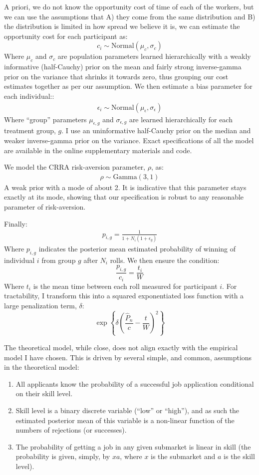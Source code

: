 \documentclass[a4paper,12pt]{article}
\begin{document}
A priori, we do not know the opportunity cost of time of each of the workers, but we can use the assumptions that A) they come from the same distribution and B) the distribution is limited in how spread we believe it is, we can estimate the opportunity cost for each participant as:
$$
c_i \sim \text{Normal}(\mu_c, \sigma_c)
$$
Where $\mu_c$ and $\sigma_c$ are population parameters learned hierarchically with a weakly informative (half-Cauchy) prior on the mean and fairly strong inverse-gamma prior on the variance that shrinks it towards zero, thus grouping our cost estimates together as per our assumption. We then estimate a bias parameter for each individual::
\begin{align*}
  \epsilon_i \sim \text{Normal}(\mu_{\epsilon}, \sigma_{\epsilon})
\end{align*}
Where ``group'' parameters $\mu_{\epsilon, g}$ and $\sigma_{\epsilon, g}$ are learned hierarchically for each treatment group, $g$. I use an uninformative half-Cauchy prior on the median and weaker inverse-gamma prior on the variance. Exact specifications of all the model are available in the online supplementary materials and code.

We model the CRRA risk-aversion parameter, $\rho$, as:
\begin{align*}
  \rho \sim \text{Gamma}(3, 1)
\end{align*}
A weak prior with a mode of about 2. It is indicative that this parameter stays exactly at its mode, showing that our specification is robust to any reasonable parameter of risk-aversion.

Finally:
\begin{align*}
  p_{i,g} = \frac{1}{1 + N_i(1 + \epsilon_g)}
\end{align*}
Where $p_{i,g}$ indicates the posterior mean estimated probability of winning of individual $i$ from group $g$ after $N_i$ rolls. We then ensure the condition:
$$
\frac{p_{i,g}}{c_i} = \frac{t_i}{W}
$$
Where $t_i$ is the mean time between each roll measured for participant $i$. For tractability, I transform this into a squared exponentiated loss function with a large penalization term, $\delta$:
$$
\exp \left\{ \delta \left(\frac{\hat{P}_n}{c} - \frac{t}{W} \right)^2 \right\}
$$

The theoretical model, while close, does not align exactly with the empirical model I have chosen. This is driven by several simple, and common, assumptions in the theoretical model:
%
\begin{enumerate}
\item All applicants know the probability of a successful job application conditional on their skill level.
\item Skill level is a binary discrete variable (``low'' or ``high''), and as such the estimated posterior mean of this variable is a non-linear function of the numbers of rejections (or successes).
\item The probability of getting a job in any given submarket is linear in skill (the probability is given, simply, by $xa$, where $x$ is the submarket and $a$ is the skill level).
\end{enumerate}
\end{document}
